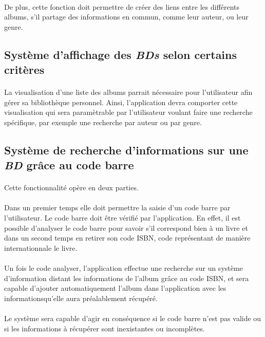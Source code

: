 \paragraph{}  
De plus, cette fonction doit permettre de créer des liens entre les différents albums, s'il partage des informations en commun, comme leur auteur, ou leur genre.

\subsection{Système d'affichage des \emph{BDs} selon certains critères}
\paragraph{}
La visualisation d'une liste des albums parrait nécessaire pour l'utilisateur afin gérer sa bibliothèque personnel. Ainsi, l'application devra comporter cette visualisation qui sera paramètrable par l'utilisateur voulant faire une recherche spécifique, par exemple une recherche par auteur ou par genre.

\subsection{Système de recherche d'informations sur une \emph{BD}  grâce au code barre}
\paragraph{}
Cette fonctionnalité opère en deux parties.
\paragraph{}  
Dans un premier temps elle doit permettre la saisie d'un code barre par l'utilisateur. Le code barre doit être vérifié par l'application. En effet, il est possible d'analyser le code barre pour savoir s'il correspond bien à un livre et dans un second temps en retirer son code ISBN, code représentant de manière internationnale le livre.
\paragraph{}  
Un fois le code analyser, l'application effectue une recherche sur un système d'information distant les informations de l'album grâce au code ISBN, et sera capable d'ajouter automatiquement l'album dans l'application avec les informationsqu'elle aura préalablement récupéré.
\paragraph{}  
Le système sera capable d'agir en conséquence si le code barre n'est pas valide ou si les informations à récupérer sont inexistantes ou incomplètes.

